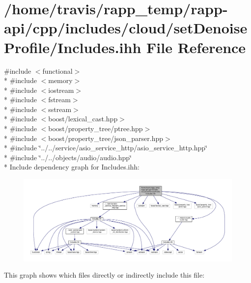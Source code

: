\hypertarget{cloud_2setDenoiseProfile_2Includes_8ihh}{\section{/home/travis/rapp\-\_\-temp/rapp-\/api/cpp/includes/cloud/set\-Denoise\-Profile/\-Includes.ihh File Reference}
\label{cloud_2setDenoiseProfile_2Includes_8ihh}
}
{\ttfamily \#include $<$functional$>$}\\*
{\ttfamily \#include $<$memory$>$}\\*
{\ttfamily \#include $<$iostream$>$}\\*
{\ttfamily \#include $<$fstream$>$}\\*
{\ttfamily \#include $<$sstream$>$}\\*
{\ttfamily \#include $<$boost/lexical\-\_\-cast.\-hpp$>$}\\*
{\ttfamily \#include $<$boost/property\-\_\-tree/ptree.\-hpp$>$}\\*
{\ttfamily \#include $<$boost/property\-\_\-tree/json\-\_\-parser.\-hpp$>$}\\*
{\ttfamily \#include \char`\"{}../../service/asio\-\_\-service\-\_\-http/asio\-\_\-service\-\_\-http.\-hpp\char`\"{}}\\*
{\ttfamily \#include \char`\"{}../../objects/audio/audio.\-hpp\char`\"{}}\\*
Include dependency graph for Includes.\-ihh\-:
\nopagebreak
\begin{figure}[H]
\begin{center}
\leavevmode
\includegraphics[width=350pt]{cloud_2setDenoiseProfile_2Includes_8ihh__incl}
\end{center}
\end{figure}
This graph shows which files directly or indirectly include this file\-:
\nopagebreak
